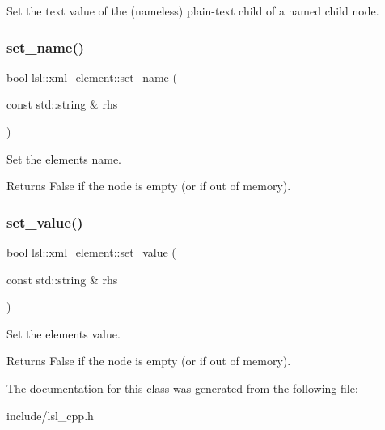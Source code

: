 Set the text value of the (nameless) plain-\/text child of a named child node. \mbox{\label{classlsl_1_1xml__element_a8ddf2b35719b273dbb5700f16a2da4e5}} 
\subsubsection{\texorpdfstring{set\+\_\+name()}{set\_name()}}
{\footnotesize\ttfamily bool lsl\+::xml\+\_\+element\+::set\+\_\+name (\begin{DoxyParamCaption}\item[{const std\+::string \&}]{rhs }\end{DoxyParamCaption})\hspace{0.3cm}{\ttfamily [inline]}}

Set the element\textquotesingle{}s name. \begin{DoxyReturn}{Returns}
False if the node is empty (or if out of memory). 
\end{DoxyReturn}
\mbox{\label{classlsl_1_1xml__element_a3a3bbf2468ba3abd9309764faa61a7a4}} 
\subsubsection{\texorpdfstring{set\+\_\+value()}{set\_value()}}
{\footnotesize\ttfamily bool lsl\+::xml\+\_\+element\+::set\+\_\+value (\begin{DoxyParamCaption}\item[{const std\+::string \&}]{rhs }\end{DoxyParamCaption})\hspace{0.3cm}{\ttfamily [inline]}}

Set the element\textquotesingle{}s value. \begin{DoxyReturn}{Returns}
False if the node is empty (or if out of memory). 
\end{DoxyReturn}


The documentation for this class was generated from the following file\+:\begin{DoxyCompactItemize}
\item 
include/lsl\+\_\+cpp.\+h\end{DoxyCompactItemize}
